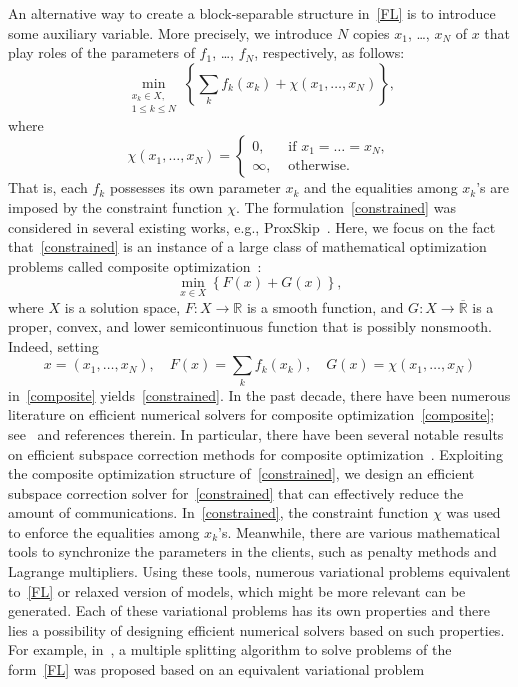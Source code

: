 \begin{itemize}
An alternative way to create a block-separable structure in~\cref{FL} is to introduce some auxiliary variable. More precisely, we introduce $N$ copies $x_1$, \dots, $x_N$ of $x$ that play roles of the parameters of $f_1$, \dots, $f_N$, respectively, as follows:
\begin{equation}
    \label{constrained}
    \min_{\substack{x_k \in X,\\1\leq k\leq N}} \left\{ \sum_k f_k (x_k) + \chi (x_1, \dots, x_N) \right\},
\end{equation}
where
\begin{equation*}
    \chi(x_1, \dots, x_N) = \begin{cases}
    0, & \textrm{ if } x_1 = \dots = x_N, \\
    \infty, & \textrm{ otherwise.}
    \end{cases}
\end{equation*}
That is, each $f_k$ possesses its own parameter $x_k$ and the equalities among $x_k$'s are imposed by the constraint function $\chi$. The formulation~\cref{constrained} was considered in several existing works, e.g., ProxSkip~\cite{mishchenko2022proxskip}. Here, we focus on the fact that~\cref{constrained} is an instance of a large class of mathematical optimization problems called composite optimization~\cite{Nesterov:2013}:
\begin{equation}
    \label{composite}
    \min_{x \in X} \left\{ F(x) + G(x) \right\},
\end{equation}
where $X$ is a solution space, $F \colon X \rightarrow \mathbb{R}$ is a smooth function, and $G \colon X \rightarrow \overline{\mathbb{R}}$ is a proper, convex, and lower semicontinuous function that is possibly nonsmooth.
Indeed, setting
\begin{equation*}
    x = (x_1, \dots, x_N), \quad
    F(x) = \sum_k f_k (x_k), \quad
    G(x) = \chi (x_1, \dots, x_N)
\end{equation*}
in~\cref{composite} yields~\cref{constrained}. In the past decade, there have been numerous literature on efficient numerical solvers for composite optimization~\cref{composite}; see~\cite{CP:2016,Nesterov:2013,Teboulle:2018} and references therein. In particular, there have been several notable results on efficient subspace correction methods for composite optimization~\cite{Park:2021,Park:2022}. Exploiting the composite optimization structure of~\cref{constrained}, we design an efficient subspace correction solver for~\cref{constrained} that can effectively reduce the amount of communications. In~\cref{constrained}, the constraint function $\chi$ was used to enforce the equalities among $x_k$'s. Meanwhile, there are various mathematical tools to synchronize the parameters in the clients, such as penalty methods and Lagrange multipliers. Using these tools, numerous variational problems equivalent to~\cref{FL} or relaxed version of models, which might be more relevant can be generated. Each of these variational problems has its own properties and there lies a possibility of designing efficient numerical solvers based on such properties. For example, in~\cite{GM:2012}, a multiple splitting algorithm to solve problems of the form~\cref{FL} was proposed based on an equivalent variational problem

\end{itemize}
